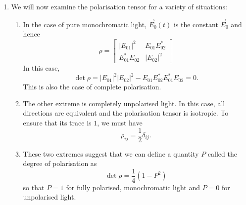 \begin{enumerate}
\item We will now examine the polarisation tensor for a variety of situations:
\begin{enumerate}
\item In the case of pure monochromatic light, $\vec{E}_0(t)$ is the constant
$\vec{E}_0$ and hence
\begin{equation}\label{c6e87}
\rho = \begin{bmatrix}|E_{01}|^2 & E_{01}E_{02}^\ast \\ 
                      E_{01}^\ast E_{02} & |E_{02}|^2 
       \end{bmatrix}
\end{equation}
In this case, 
\begin{equation}\label{c6e88}
\det\rho = |E_{01}|^2|E_{02}|^2 - E_{01}E_{02}^\ast E_{01}^\ast E_{02} = 0.
\end{equation}
This is also the case of complete polarisation.

\item The other extreme is completely unpolarised light. In this case, all
directions are equivalent and the polarisation tensor is isotropic. To ensure
that its trace is $1$, we must have
\begin{equation}\label{c6e89}
\rho_{ij} = \frac{1}{2}\delta_{ij}.
\end{equation}

\item These two extremes suggest that we can define a quantity $P$ called the
degree of polarisation as
\begin{equation}\label{c6e90}
\det\rho = \frac{1}{4}(1 - P^2)
\end{equation}
so that $P = 1$ for fully polarised, monochromatic light and $P = 0$ for 
unpolarised light.
\end{enumerate}


\end{enumerate}
